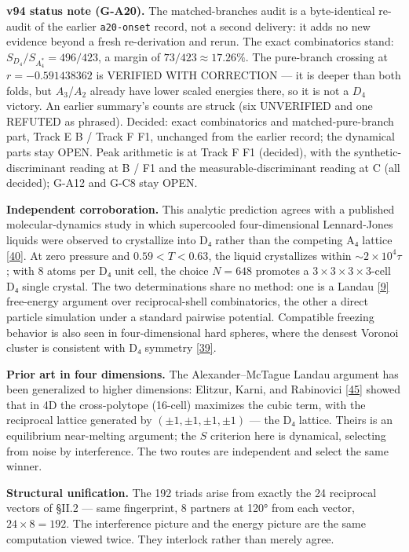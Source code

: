 \documentclass[a4paper,11pt]{article}
\begin{document}
\textbf{v94 status note (G-A20).} The matched-branches audit is a byte-identical re-audit of the earlier \texttt{a20-onset} record, not a second delivery: it adds no new evidence beyond a fresh re-derivation and rerun. The exact combinatorics stand: $S_{D_4}/S_{A_4^*}=496/423$, a margin of $73/423\approx17.26\%$. The pure-branch crossing at $r=-0.591438362$ is VERIFIED WITH CORRECTION --- it is deeper than both folds, but $A_3$/$A_2$ already have lower scaled energies there, so it is not a $D_4$ victory. An earlier summary's counts are struck (six UNVERIFIED and one REFUTED as phrased). Decided: exact combinatorics and matched-pure-branch part, Track E B / Track F F1, unchanged from the earlier record; the dynamical parts stay OPEN. Peak arithmetic is at Track F F1 (decided), with the synthetic-discriminant reading at B / F1 and the measurable-discriminant reading at C (all decided); G-A12 and G-C8 stay OPEN.

\textbf{Independent corroboration.} This analytic prediction agrees with a published molecular-dynamics study in which supercooled four-dimensional Lennard-Jones liquids were observed to crystallize into D₄ rather than the competing A₄ lattice \hyperref[ref40]{[40]}. At zero pressure and $0.59<T<0.63$, the liquid crystallizes within ${\sim}2\times10^4\tau$; with 8 atoms per D₄ unit cell, the choice $N=648$ promotes a $3\times3\times3\times3$-cell D₄ single crystal. The two determinations share no method: one is a Landau \hyperref[ref9]{[9]} free-energy argument over reciprocal-shell combinatorics, the other a direct particle simulation under a standard pairwise potential. Compatible freezing behavior is also seen in four-dimensional hard spheres, where the densest Voronoi cluster is consistent with D₄ symmetry \hyperref[ref39]{[39]}.

\textbf{Prior art in four dimensions.} The Alexander–McTague Landau argument has been generalized to higher dimensions: Elitzur, Karni, and Rabinovici \hyperref[ref45]{[45]} showed that in 4D the cross-polytope (16-cell) maximizes the cubic term, with the reciprocal lattice generated by $(\pm1,\pm1,\pm1,\pm1)$ — the D₄ lattice. Theirs is an equilibrium near-melting argument; the $S$ criterion here is dynamical, selecting from noise by interference. The two routes are independent and select the same winner.

\textbf{Structural unification.} The 192 triads arise from exactly the 24 reciprocal vectors of §II.2 — same fingerprint, 8 partners at 120° from each vector, $24\times8=192$. The interference picture and the energy picture are the same computation viewed twice. They interlock rather than merely agree.
\end{document}
